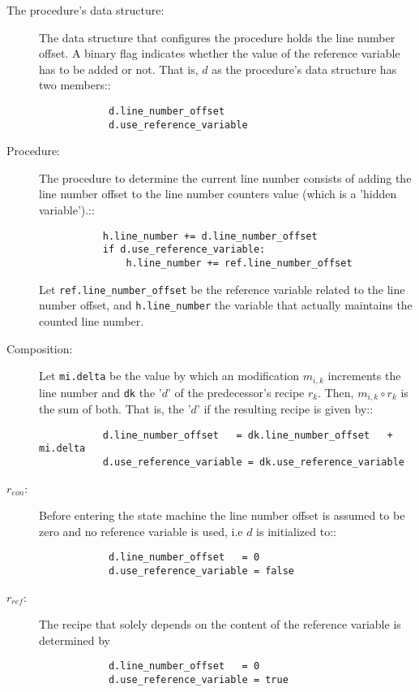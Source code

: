 \documentclass[12pt,a4paper]{scrartcl}
\begin{document}
\begin{description}
    \item[The procedure's data structure:] The data structure that configures
        the procedure holds the line number offset. A binary flag indicates whether
        the value of the reference variable has to be added or not. That is, $d$
        as the procedure's data structure has two members::

    \begin{verbatim}
            d.line_number_offset
            d.use_reference_variable
    \end{verbatim}
      
    \item[Procedure:] The procedure to determine the current line number
        consists of adding the line number offset to the line number
        counters value (which is a 'hidden variable').::

    \begin{verbatim}
           h.line_number += d.line_number_offset 
           if d.use_reference_variable:
               h.line_number += ref.line_number_offset 
    \end{verbatim}

        Let \verb|ref.line_number_offset| be the reference variable related to
        the line number offset, and \verb|h.line_number| the variable that
        actually maintains the counted line number.

   \item[Composition:] Let \verb/mi.delta/ be the value by which an modification
       $m_{i,k}$ increments the line number and \verb/dk/ the '$d$' of the
       predecessor's recipe $r_k$.  Then, $m_{i,k}\circ r_k$ is the sum of both.
       That is, the '$d$' if the resulting recipe is given by::

    \begin{verbatim}
           d.line_number_offset   = dk.line_number_offset   + mi.delta
           d.use_reference_variable = dk.use_reference_variable
    \end{verbatim}

   \item[$r_{eon}$:] Before entering the state machine the line number offset
        is assumed to be zero and no reference variable is used, i.e $d$ is
        initialized to::

    \begin{verbatim}
            d.line_number_offset   = 0
            d.use_reference_variable = false
    \end{verbatim}

   \item[$r_{ref}$:] The recipe that solely depends on the content of the
       reference variable is determined by 

    \begin{verbatim}
            d.line_number_offset   = 0
            d.use_reference_variable = true
    \end{verbatim}
\end{description}
\end{document}
